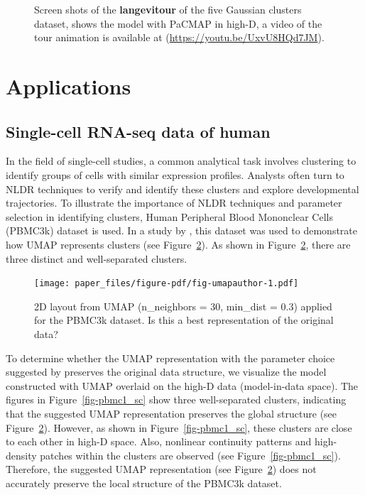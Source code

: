 \documentclass[
  12pt]{article}
\begin{document}
\begin{figure}[H]
\begin{minipage}[t]{0.33\linewidth}
{{}

}

\subcaption{\label{fig-gau5_sc3}}
\end{minipage}%

\caption{\label{fig-gau5_sc}Screen shots of the \textbf{langevitour} of
the five Gaussian clusters dataset, shows the model with PaCMAP in
high-D, a video of the tour animation is available at
(\url{https://youtu.be/UxvU8HQd7JM}).}

\end{figure}

\hypertarget{sec-applications}{%
\section{Applications}\label{sec-applications}}

\hypertarget{single-cell-rna-seq-data-of-human}{%
\subsection{Single-cell RNA-seq data of
human}\label{single-cell-rna-seq-data-of-human}}

In the field of single-cell studies, a common analytical task involves
clustering to identify groups of cells with similar expression profiles.
Analysts often turn to NLDR techniques to verify and identify these
clusters and explore developmental trajectories. To illustrate the
importance of NLDR techniques and parameter selection in identifying
clusters, Human Peripheral Blood Mononclear Cells (PBMC3k) dataset
\citep{chen2023} is used. In a study by \citet{chen2023}, this dataset
was used to demonstrate how UMAP represents clusters (see
Figure~\ref{fig-umapauthor}). As shown in Figure~\ref{fig-umapauthor},
there are three distinct and well-separated clusters.

\begin{figure}[H]

{\centering \texttt{[image: paper\_files/figure-pdf/fig-umapauthor-1.pdf]}

}

\caption{\label{fig-umapauthor}2D layout from UMAP (n\_neighbors = 30,
min\_dist = 0.3) applied for the PBMC3k dataset. Is this a best
representation of the original data?}

\end{figure}

To determine whether the UMAP representation with the parameter choice
suggested by \citet{chen2023} preserves the original data structure, we
visualize the model constructed with UMAP overlaid on the high-D data
(model-in-data space). The figures in Figure~\ref{fig-pbmc1_sc} show
three well-separated clusters, indicating that the suggested UMAP
representation preserves the global structure (see
Figure~\ref{fig-umapauthor}). However, as shown in
Figure~\ref{fig-pbmc1_sc}, these clusters are close to each other in
high-D space. Also, nonlinear continuity patterns and high-density
patches within the clusters are observed (see
Figure~\ref{fig-pbmc1_sc}). Therefore, the suggested UMAP representation
(see Figure~\ref{fig-umapauthor}) does not accurately preserve the local
structure of the PBMC3k dataset.
\end{document}
